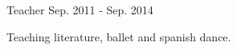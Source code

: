 

\begin{cventries}

  \cventry
    {Teacher} %
    {} %
    {} %
    {Sep. 2011 - Sep. 2014} %
    {
      \begin{cvitems} %
        \item {Teaching literature, ballet and spanish dance.}
      \end{cvitems}
    }

\end{cventries}
